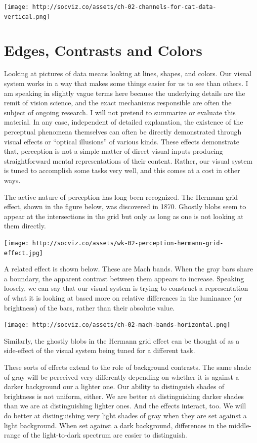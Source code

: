 \documentclass[]{book}
\theoremstyle{definition}
\theoremstyle{definition}
\theoremstyle{definition}
\theoremstyle{remark}
\begin{document}
\texttt{[image: http://socviz.co/assets/ch-02-channels-for-cat-data-vertical.png]}

\hypertarget{edges-contrasts-and-colors}{%
\section{Edges, Contrasts and Colors}\label{edges-contrasts-and-colors}}

Looking at pictures of data means looking at lines, shapes, and colors.
Our visual system works in a way that makes some things easier for us to
see than others. I am speaking in slightly vague terms here because the
underlying details are the remit of vision science, and the exact
mechanisms responsible are often the subject of ongoing research. I will
not pretend to summarize or evaluate this material. In any case,
independent of detailed explanation, the existence of the perceptual
phenomena themselves can often be directly demonstrated through visual
effects or ``optical illusions'' of various kinds. These effects
demonstrate that, perception is not a simple matter of direct visual
inputs producing straightforward mental representations of their
content. Rather, our visual system is tuned to accomplish some tasks
very well, and this comes at a cost in other ways.

The active nature of perception has long been recognized. The Hermann
grid effect, shown in the figure below, was discovered in 1870. Ghostly
blobs seem to appear at the intersections in the grid but only as long
as one is not looking at them directly.

\texttt{[image: http://socviz.co/assets/wk-02-perception-hermann-grid-effect.jpg]}

A related effect is shown below. These are Mach bands. When the gray
bars share a boundary, the apparent contrast between them appears to
increase. Speaking loosely, we can say that our visual system is trying
to construct a representation of what it is looking at based more on
relative differences in the luminance (or brightness) of the bars,
rather than their absolute value.

\texttt{[image: http://socviz.co/assets/ch-02-mach-bands-horizontal.png]}

Similarly, the ghostly blobs in the Hermann grid effect can be thought
of as a side-effect of the visual system being tuned for a different
task.

These sorts of effects extend to the role of background contrasts. The
same shade of gray will be perceived very differently depending on
whether it is against a darker background our a lighter one. Our ability
to distinguish shades of brightness is not uniform, either. We are
better at distinguishing darker shades than we are at distinguishing
lighter ones. And the effects interact, too. We will do better at
distinguishing very light shades of gray when they are set against a
light background. When set against a dark background, differences in the
middle-range of the light-to-dark spectrum are easier to distinguish.
\end{document}

